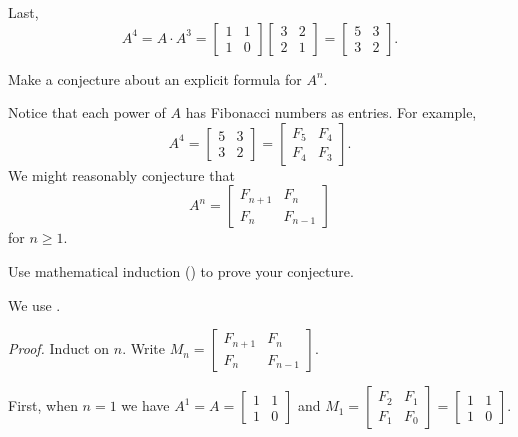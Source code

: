 \begin{exam}
\begin{apart}
\begin{soln}
                    Last,
                        $$A^4= A\cdot A^3=\left[ \begin{array}{cc} 1 & 1\\ 1 & 0 \end{array} \right]\left[ \begin{array}{cc} 3 & 2\\ 2 & 1 \end{array} \right]= \left[ \begin{array}{cc} 5 & 3\\ 3 & 2 \end{array} \right].$$
                \end{soln}
            \item Make a conjecture about an explicit formula for $A^n$.
                \begin{soln}
                    Notice that each power of $A$ has Fibonacci numbers as entries.  For example,
                        $$A^4= \left[ \begin{array}{cc} 5 & 3\\ 3 & 2 \end{array} \right]
                        = \left[ \begin{array}{cc} F_5 & F_4\\ F_4 & F_3 \end{array} \right].$$
                    We might reasonably conjecture that
                        $$A^n= \left[ \begin{array}{cc} F_{n+1} & F_n \\ F_n & F_{n-1} \end{array} \right]$$
                    for $n \ge 1$.
                \end{soln}
            \item \label{part_proof_matrix_fib} Use mathematical induction () to prove your conjecture.
                \begin{soln}  We use .
                
                    \emph{Proof.}  Induct on $n$.  Write $M_n = \left[ \begin{array}{cc} F_{n+1} & F_n \\ F_n & F_{n-1} \end{array} \right]$.
                    
                    First, when $n=1$ we have $A^1=A = \left[ \begin{array}{cc} 1 & 1\\ 1 & 0 \end{array} \right]$ and $M_1 = \left[ \begin{array}{cc} F_{2} & F_1 \\ F_1 & F_0 \end{array} \right] = \left[ \begin{array}{cc} 1 & 1 \\ 1 & 0 \end{array} \right]$.


\end{soln}
\end{apart}
\end{exam}
